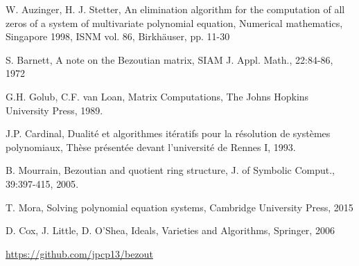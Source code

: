 \documentclass{standalone}
\begin{document}
  \begin{thebibliography}{00}

  {W. Auzinger, H. J. Stetter},
  {An elimination algorithm for the computation of all zeros of a system of multivariate polynomial equation},
  {Numerical mathematics, Singapore 1998, ISNM vol. 86, Birkhäuser, pp. 11-30}

  {S. Barnett}, {A note on the Bezoutian matrix},
  {SIAM J. Appl. Math., 22:84-86}, {1972}

  {G.H. Golub, C.F. van Loan},
  {Matrix Computations}, {The Johns Hopkins University Press}, {1989}.

  {J.P. Cardinal}, {Dualité et algorithmes itératifs pour la résolution de systèmes polynomiaux}, {Thèse présentée devant l'université de Rennes I}, {1993}.

  {B. Mourrain}, {Bezoutian and quotient ring structure},
  {J. of Symbolic Comput., 39:397-415}, {2005}.

  {T. Mora}, {Solving polynomial equation systems}, {Cambridge University Press}, {2015}

  {D. Cox, J. Little, D. O'Shea},
  {Ideals, Varieties and Algorithms}, {Springer}, {2006}

  \url{https://github.com/jpcp13/bezout}

  \end{thebibliography}
\end{document}
